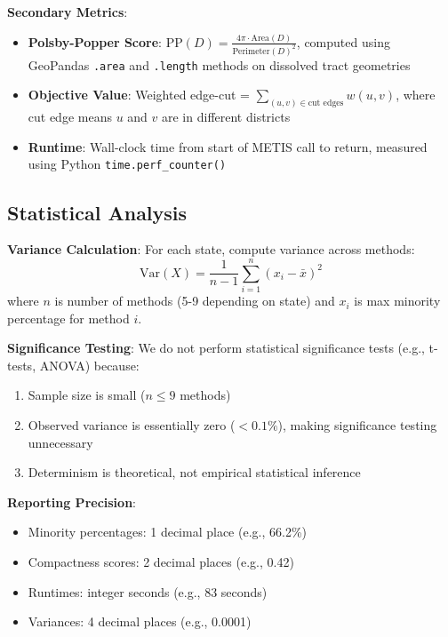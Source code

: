 \textbf{Secondary Metrics}:
\begin{itemize}
    \item \textbf{Polsby-Popper Score}: $\text{PP}(D) = \frac{4\pi \cdot \text{Area}(D)}{\text{Perimeter}(D)^2}$, computed using GeoPandas \texttt{.area} and \texttt{.length} methods on dissolved tract geometries

    \item \textbf{Objective Value}: Weighted edge-cut = $\sum_{(u,v) \in \text{cut edges}} w(u,v)$, where cut edge means $u$ and $v$ are in different districts

    \item \textbf{Runtime}: Wall-clock time from start of METIS call to return, measured using Python \texttt{time.perf\_counter()}
\end{itemize}

\subsection{Statistical Analysis}

\textbf{Variance Calculation}:
For each state, compute variance across methods:
\[
\text{Var}(X) = \frac{1}{n-1} \sum_{i=1}^{n} (x_i - \bar{x})^2
\]
where $n$ is number of methods (5-9 depending on state) and $x_i$ is max minority percentage for method $i$.

\textbf{Significance Testing}:
We do not perform statistical significance tests (e.g., t-tests, ANOVA) because:
\begin{enumerate}
    \item Sample size is small ($n \leq 9$ methods)
    \item Observed variance is essentially zero ($< 0.1\%$), making significance testing unnecessary
    \item Determinism is theoretical, not empirical statistical inference
\end{enumerate}

\textbf{Reporting Precision}:
\begin{itemize}
    \item Minority percentages: 1 decimal place (e.g., 66.2\%)
    \item Compactness scores: 2 decimal places (e.g., 0.42)
    \item Runtimes: integer seconds (e.g., 83 seconds)
    \item Variances: 4 decimal places (e.g., 0.0001)
\end{itemize}

